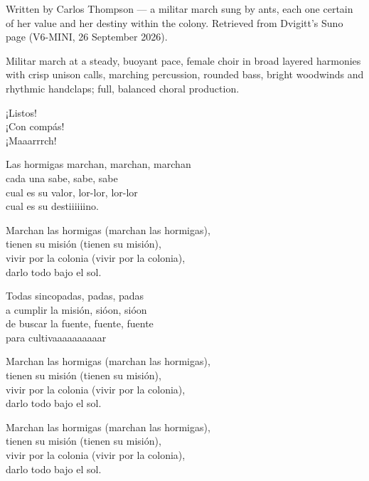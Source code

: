 
\begin{notes}
Written by Carlos Thompson — a militar march sung by ants, each one certain of her value and her destiny within the colony. Retrieved from Dvigitt's Suno page (V6-MINI, 26 September 2026).
\end{notes}
\begin{style}
Militar march at a steady, buoyant pace, female choir in broad layered harmonies with crisp unison calls, marching percussion, rounded bass, bright woodwinds and rhythmic handclaps; full, balanced choral production.
\end{style}
\begin{lyrics}
¡Listos!\\
¡Con compás!\\
¡Maaarrrch!

Las hormigas marchan, marchan, marchan\\
cada una sabe, sabe, sabe\\
cual es su valor, lor-lor, lor-lor\\
cual es su destiiiiiino.

Marchan las hormigas (marchan las hormigas),\\
tienen su misión (tienen su misión),\\
vivir por la colonia (vivir por la colonia),\\
darlo todo bajo el sol.

Todas sincopadas, padas, padas\\
a cumplir la misión, sióon, sióon\\
de buscar la fuente, fuente, fuente\\
para cultivaaaaaaaaaar

Marchan las hormigas (marchan las hormigas),\\
tienen su misión (tienen su misión),\\
vivir por la colonia (vivir por la colonia),\\
darlo todo bajo el sol.

Marchan las hormigas (marchan las hormigas),\\
tienen su misión (tienen su misión),\\
vivir por la colonia (vivir por la colonia),\\
darlo todo bajo el sol.
\end{lyrics}


